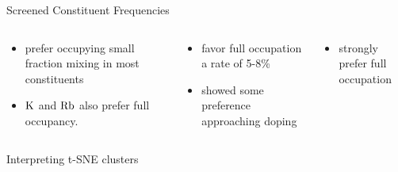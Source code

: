 \documentclass[10pt, aspectratio=169, presentation]{beamer}
\begin{document}
\begin{frame}[label={sec:orge219a05}]{Screened Constituent Frequencies}
 
\begin{center}

\end{center}

\begin{columns}
\begin{column}{0.3\columnwidth}
\begin{itemize}
\item prefer occupying small fraction mixing in most constituents
\item \(\ce{K}\) and \(\ce{Rb}\) also prefer full occupancy.
\end{itemize}
\end{column}

\begin{column}{0.3\columnwidth}
\begin{itemize}
\item favor full occupation a rate of 5-8\%
\item showed some preference approaching doping
\end{itemize}
\end{column}

\begin{column}{0.3\columnwidth}
\begin{itemize}
\item strongly prefer full occupation
\end{itemize}
\end{column}
\end{columns}
\end{frame}

\begin{frame}[label={sec:org8c40697}]{Interpreting t-SNE clusters}
\begin{columns}
\begin{column}{0.5\columnwidth}
 
\begin{center}

\end{center}
\end{column}

\begin{column}{0.5\columnwidth}
 
\begin{center}

\end{center}
\end{column}
\end{columns}
\end{frame}
\end{document}
